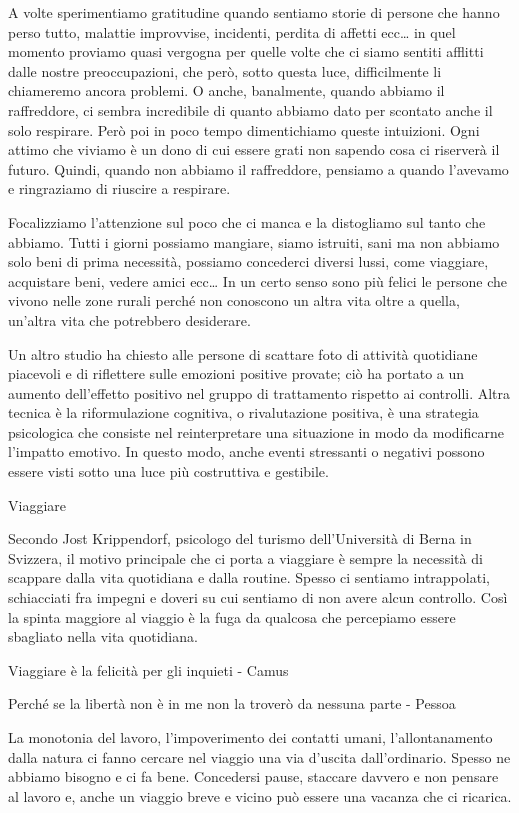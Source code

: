 \documentclass[12pt]{book} %
\begin{document}
A volte sperimentiamo gratitudine quando sentiamo storie di persone che hanno perso tutto, malattie improvvise, incidenti,
perdita di affetti ecc… in quel momento proviamo quasi vergogna per quelle volte che ci siamo sentiti afflitti dalle
nostre preoccupazioni, che però, sotto questa luce, difficilmente li chiameremo ancora problemi. O anche,
banalmente, quando abbiamo il raffreddore, ci sembra incredibile di quanto abbiamo dato per scontato anche il solo
respirare. Però poi in poco tempo dimentichiamo queste intuizioni. Ogni attimo che viviamo è un dono di cui
essere grati non sapendo cosa ci riserverà il futuro. Quindi, quando non abbiamo il raffreddore, pensiamo a quando l'avevamo e ringraziamo di riuscire a respirare.

Focalizziamo l'attenzione sul poco che ci manca e la distogliamo sul tanto che abbiamo. Tutti i
giorni possiamo mangiare, siamo istruiti, sani ma non abbiamo solo beni di prima necessità, possiamo concederci diversi
lussi, come viaggiare, acquistare beni, vedere amici ecc…
In un certo senso sono più felici le persone che vivono nelle zone rurali perché non conoscono un altra vita oltre a
quella, un'altra vita che potrebbero desiderare.

Un altro studio ha chiesto alle persone di scattare foto di attività quotidiane piacevoli e di riflettere sulle emozioni positive provate; ciò ha portato a un aumento dell'effetto positivo nel gruppo di trattamento rispetto ai controlli.
Altra tecnica è la riformulazione cognitiva, o rivalutazione positiva, è una strategia psicologica che consiste nel reinterpretare una situazione in modo da modificarne l’impatto emotivo. In questo modo, anche eventi stressanti o negativi possono essere visti sotto una luce più costruttiva e gestibile.

\begin{mdframed}[linewidth=1pt]
Viaggiare

Secondo Jost Krippendorf, psicologo del turismo dell'Università di Berna in Svizzera, il motivo principale che ci porta
a viaggiare è sempre la necessità di scappare dalla vita quotidiana e dalla routine. Spesso ci sentiamo intrappolati,
schiacciati fra impegni e doveri su cui sentiamo di non avere alcun controllo. Così la spinta maggiore al viaggio è la
fuga da qualcosa che percepiamo essere sbagliato nella vita quotidiana. 

Viaggiare è la felicità per gli inquieti - Camus

Perché se la libertà non è in me non la troverò da nessuna parte - Pessoa

La monotonia del lavoro, l'impoverimento dei contatti umani, l'allontanamento dalla natura ci fanno cercare nel viaggio
una via d'uscita dall'ordinario. Spesso ne abbiamo bisogno e ci fa bene. Concedersi pause, staccare davvero e non
pensare al lavoro e, anche un viaggio breve e vicino può essere una vacanza che ci ricarica. 
\end{mdframed}
\end{document}
